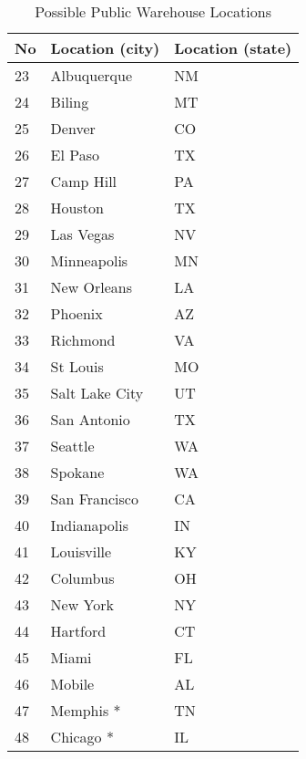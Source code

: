 \documentclass[12pt,a4paper]{article}
\begin{document}
\begin{table}[!h]
    \centering
    \caption{Possible Public Warehouse Locations}
    \label{tab:tabela2-enunciado}
    \begin{tabular}{|l|l|l|}
    \hline
    No & Location (city) & Location (state) \\
    \hline
    23 & Albuquerque     & NM               \\
    24 & Biling          & MT               \\
    25 & Denver          & CO               \\
    26 & El Paso         & TX               \\
    27 & Camp Hill       & PA               \\
    28 & Houston         & TX               \\
    29 & Las Vegas       & NV               \\
    30 & Minneapolis     & MN               \\
    31 & New Orleans     & LA               \\
    32 & Phoenix         & AZ               \\
    33 & Richmond        & VA               \\
    34 & St Louis        & MO               \\
    35 & Salt Lake City  & UT               \\
    36 & San Antonio     & TX               \\
    37 & Seattle         & WA               \\
    38 & Spokane         & WA               \\
    39 & San Francisco   & CA               \\
    40 & Indianapolis    & IN               \\
    41 & Louisville      & KY               \\
    42 & Columbus        & OH               \\
    43 & New York        & NY               \\
    44 & Hartford        & CT               \\
    45 & Miami           & FL               \\
    46 & Mobile          & AL               \\
    47 & Memphis *       & TN               \\
    48 & Chicago *       & IL               \\
    \hline
\end{tabular}
\end{table}
\end{document}

